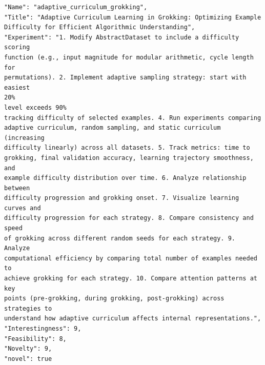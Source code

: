 \begin{tcolorbox}[breakable,colback=blue!5!white, colframe=blue!75!black, title=Idea 39/50 - \texttt{adaptive\_curriculum\_grokking}]
\small
\begin{verbatim}
"Name": "adaptive_curriculum_grokking",
"Title": "Adaptive Curriculum Learning in Grokking: Optimizing Example
Difficulty for Efficient Algorithmic Understanding",
"Experiment": "1. Modify AbstractDataset to include a difficulty scoring
function (e.g., input magnitude for modular arithmetic, cycle length for
permutations). 2. Implement adaptive sampling strategy: start with easiest
20%
level exceeds 90%
tracking difficulty of selected examples. 4. Run experiments comparing
adaptive curriculum, random sampling, and static curriculum (increasing
difficulty linearly) across all datasets. 5. Track metrics: time to
grokking, final validation accuracy, learning trajectory smoothness, and
example difficulty distribution over time. 6. Analyze relationship between
difficulty progression and grokking onset. 7. Visualize learning curves and
difficulty progression for each strategy. 8. Compare consistency and speed
of grokking across different random seeds for each strategy. 9. Analyze
computational efficiency by comparing total number of examples needed to
achieve grokking for each strategy. 10. Compare attention patterns at key
points (pre-grokking, during grokking, post-grokking) across strategies to
understand how adaptive curriculum affects internal representations.",
"Interestingness": 9,
"Feasibility": 8,
"Novelty": 9,
"novel": true
\end{verbatim}
\end{tcolorbox}

